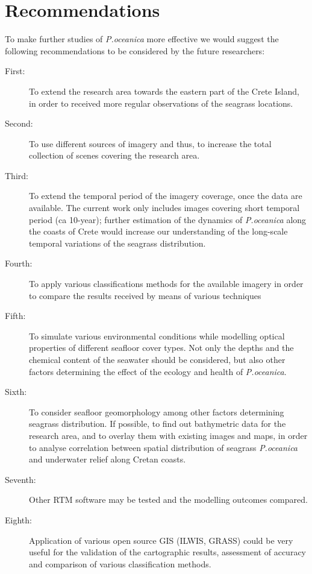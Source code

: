 \documentclass[11pt]{article}
\begin{document}
\section*{Recommendations}\label{sec:6}

To make further studies of \textit{P.oceanica} more effective we would suggest the following recommendations to be considered by the future researchers:
	\begin{description}
		\item[First:] To extend the research area towards the eastern part of the Crete Island, in order to received more regular observations of the 	seagrass locations.
		\item[Second:] To use different sources of imagery and thus, to increase the total collection of scenes covering the research area.
		\item[Third:] To extend the temporal period of the imagery coverage, once the data are available. The current work only includes images covering short temporal period (ca 10-year); further estimation of the dynamics of \textit{P.oceanica} along the coasts of Crete would increase our understanding of the long-scale temporal variations of the seagrass distribution.
		\item[Fourth:] To apply various classifications methods for the available imagery in order to compare the results received by means of various techniques
		\item[Fifth:] To simulate various environmental conditions while modelling optical properties of different seafloor cover types. Not only the depths and 	the chemical content of the seawater should be considered, but also other factors determining the effect of the ecology and health of \textit{P.oceanica}.
		\item[Sixth:] To consider seafloor geomorphology among other factors determining seagrass distribution. If possible, to find out bathymetric data for the research area, and to overlay them with existing images and maps, in order to analyse correlation between spatial distribution of seagrass \textit{P.oceanica} and underwater relief along Cretan coasts. 
		\item[Seventh:] Other RTM software may be tested and the modelling outcomes compared.
		\item[Eighth:] Application of various open source \ac{GIS} (\ac{ILWIS}, \ac{GRASS}) could be very useful for the validation of the cartographic results, assessment of accuracy and comparison of various classification methods. 

\end{description}
\end{document}
